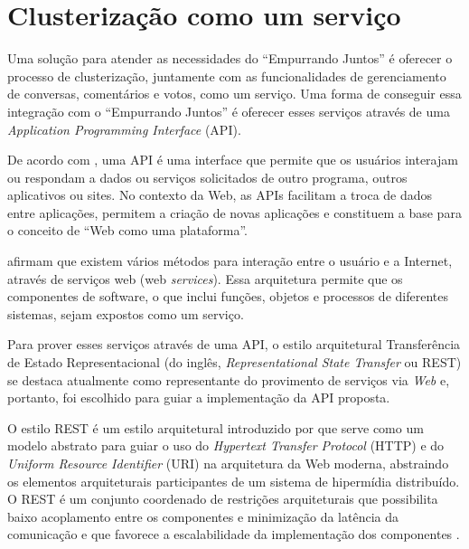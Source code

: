 \chapter{Clusterização como um serviço} \label{cap:api}

  Uma solução para atender as necessidades do ``Empurrando Juntos'' é oferecer
  o processo de clusterização, juntamente com as funcionalidades de gerenciamento
  de conversas, comentários e votos, como um serviço.
  Uma forma de conseguir essa integração com o ``Empurrando Juntos'' é oferecer
  esses serviços através de uma \textit{Application Programming Interface} (API).

  De acordo com , uma API é uma interface que permite que os 
  usuários interajam ou respondam a dados ou serviços solicitados de outro programa, outros
  aplicativos ou sites. No contexto da Web, as APIs facilitam a troca de dados entre 
  aplicações, permitem a criação de novas aplicações e constituem a base para o conceito de 
  ``Web como uma plataforma''.

   afirmam que existem vários métodos para interação entre o  
  usuário e a Internet, através de serviços web (web \textit{services}).
  Essa arquitetura permite que os componentes de software, o que inclui funções,
  objetos e processos de diferentes sistemas, sejam expostos como um serviço.

  Para prover esses serviços através de uma API, o estilo arquitetural Transferência de Estado 
  Representacional (do inglês, \textit{Representational State Transfer} ou REST)
  se destaca atualmente como representante do provimento de serviços via \textit{Web} e, portanto, foi escolhido para
  guiar a implementação da API proposta.

  O estilo REST é um estilo arquitetural introduzido por  que serve como um modelo abstrato
  para guiar o uso do \textit{Hypertext Transfer Protocol} (HTTP) e do \textit{Uniform Resource Identifier} (URI)
  na arquitetura da Web moderna, abstraindo os elementos arquiteturais participantes de um sistema de
  hipermídia distribuído.
  O REST é um conjunto coordenado de restrições arquiteturais que possibilita 
  baixo acoplamento entre os componentes e minimização da latência da comunicação e que
  favorece a escalabilidade da implementação dos componentes \cite{fielding2002}.
  
  
